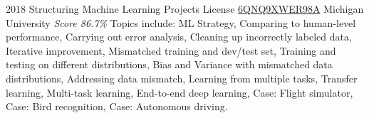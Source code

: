 \documentclass[11pt,a4paper]{moderncv}
\begin{document}
\cventry
    {2018}
    {Structuring Machine Learning Projects}
    {License
        \href{https://www.coursera.org/account/accomplishments/records/6QNQ9XWER98A}
        {6QNQ9XWER98A}
    }
    {Michigan University}
    {\textit{Score 86.7\%}}
    {
        Topics include:                                                                                           %
            ML Strategy,                                                                                          %
            Comparing to human-level performance,                                                                 %
            Carrying out error analysis,                                                                          %
            Cleaning up incorrectly labeled data,                                                                 %
            Iterative improvement,                                                                                %
            Mismatched training and dev/test set,                                                                 %
            Training and testing on different distributions,                                                      %
            Bias and Variance with mismatched data distributions,                                                 %
            Addressing data mismatch,                                                                             %
            Learning from multiple tasks,                                                                         %
            Transfer learning,                                                                                    %
            Multi-task learning,                                                                                  %
            End-to-end deep learning,                                                                             %
            Case: Flight simulator,                                                                               %
            Case: Bird recognition,                                                                               %
            Case: Autonomous driving.                                                                             %
    }
\end{document}
